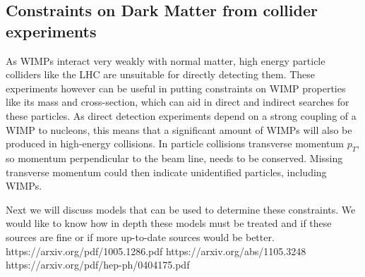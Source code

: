 \subsection{Constraints on Dark Matter from collider experiments}
As WIMPs interact very weakly with normal matter, high energy particle colliders like the LHC are unsuitable for directly detecting them. These experiments however can be useful in putting constraints on WIMP properties like its mass and cross-section, which can aid in direct and indirect searches for these particles. As direct detection experiments depend on a strong coupling of a WIMP to nucleons, this means that a significant amount of WIMPs will also be produced in high-energy collisions. In particle collisions transverse momentum $p_{T}$, so momentum perpendicular to the beam line, needs to be conserved. Missing transverse momentum could then indicate unidentified particles, including WIMPs.

Next we will discuss models that can be used to determine these constraints. We would like to know how in depth these models must be treated and if these sources are fine or if more up-to-date sources would be better.
https://arxiv.org/pdf/1005.1286.pdf
https://arxiv.org/abs/1105.3248
https://arxiv.org/pdf/hep-ph/0404175.pdf
